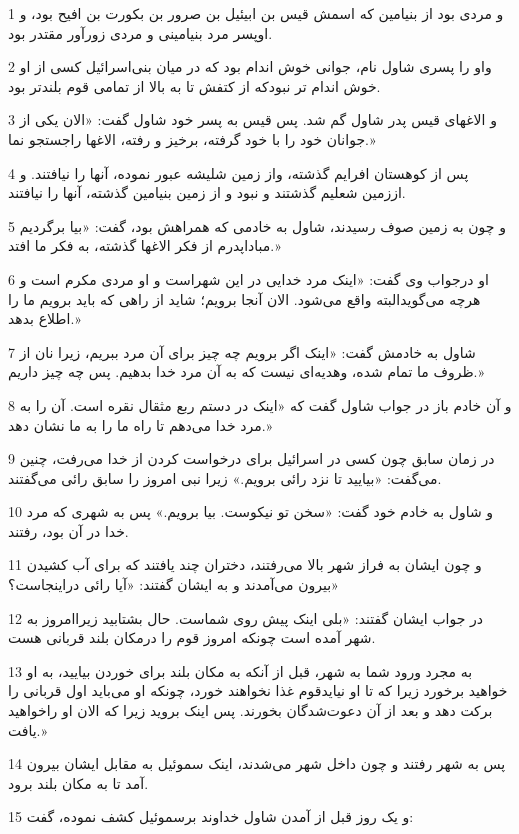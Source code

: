 \par 1 و مردی بود از بنیامین که اسمش قیس بن ابیئیل بن صرور بن بکورت بن افیح بود، و اوپسر مرد بنیامینی و مردی زورآور مقتدر بود.
\par 2 واو را پسری شاول نام، جوانی خوش اندام بود که در میان بنی‌اسرائیل کسی از او خوش اندام تر نبودکه از کتفش تا به بالا از تمامی قوم بلندتر بود.
\par 3 و الاغهای قیس پدر شاول گم شد. پس قیس به پسر خود شاول گفت: «الان یکی از جوانان خود را با خود گرفته، برخیز و رفته، الاغها راجستجو نما.»
\par 4 پس از کوهستان افرایم گذشته، واز زمین شلیشه عبور نموده، آنها را نیافتند. و اززمین شعلیم گذشتند و نبود و از زمین بنیامین گذشته، آنها را نیافتند.
\par 5 و چون به زمین صوف رسیدند، شاول به خادمی که همراهش بود، گفت: «بیا برگردیم مباداپدرم از فکر الاغها گذشته، به فکر ما افتد.»
\par 6 او درجواب وی گفت: «اینک مرد خدایی در این شهراست و او مردی مکرم است و هر‌چه می‌گویدالبته واقع می‌شود. الان آنجا برویم؛ شاید از راهی که باید برویم ما را اطلاع بدهد.»
\par 7 شاول به خادمش گفت: «اینک اگر برویم چه چیز برای آن مرد ببریم، زیرا نان از ظروف ما تمام شده، وهدیه‌ای نیست که به آن مرد خدا بدهیم. پس چه چیز داریم.»
\par 8 و آن خادم باز در جواب شاول گفت که «اینک در دستم ربع مثقال نقره است. آن را به مرد خدا می‌دهم تا راه ما را به ما نشان دهد.»
\par 9 در زمان سابق چون کسی در اسرائیل برای درخواست کردن از خدا می‌رفت، چنین می‌گفت: «بیایید تا نزد رائی برویم.» زیرا نبی امروز را سابق رائی می‌گفتند.
\par 10 و شاول به خادم خود گفت: «سخن تو نیکوست. بیا برویم.» پس به شهری که مرد خدا در آن بود، رفتند.
\par 11 و چون ایشان به فراز شهر بالا می‌رفتند، دختران چند یافتند که برای آب کشیدن بیرون می‌آمدند و به ایشان گفتند: «آیا رائی دراینجاست؟»
\par 12 در جواب ایشان گفتند: «بلی اینک پیش روی شماست. حال بشتابید زیراامروز به شهر آمده است چونکه امروز قوم را درمکان بلند قربانی هست.
\par 13 به مجرد ورود شما به شهر، قبل از آنکه به مکان بلند برای خوردن بیایید، به او خواهید برخورد زیرا که تا او نیایدقوم غذا نخواهند خورد، چونکه او می‌باید اول قربانی را برکت دهد و بعد از آن دعوت‌شدگان بخورند. پس اینک بروید زیرا که الان او راخواهید یافت.»
\par 14 پس به شهر رفتند و چون داخل شهر می‌شدند، اینک سموئیل به مقابل ایشان بیرون آمد تا به مکان بلند برود.
\par 15 و یک روز قبل از آمدن شاول خداوند برسموئیل کشف نموده، گفت:
